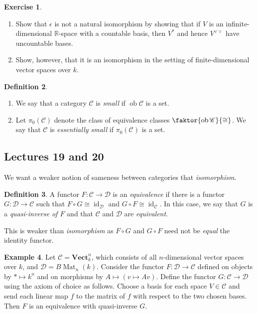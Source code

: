 \documentclass[10pt,letterpaper,cm]{nupset}
\theoremstyle{definition}
\newtheorem{definition}{Definition}[subsection]
\newtheorem{exmp}[definition]{Example}
\theoremstyle{theorem}
\newtheorem{exercise}[definition]{Exercise}
\theoremstyle{remark}
\newcommand{\R}{\mathbb R}
\newcommand{\1}{\mathbf{1}}
\renewcommand{\c}{\mathscr{C}}
\renewcommand{\d}{\mathscr{D}}
\newcommand{\0}{\vec 0}
\DeclareMathOperator{\id}{\mathrm{id}}
\DeclareMathOperator{\ob}{ob}
\DeclareMathOperator{\Mat}{Mat}
\begin{document}
\begin{exercise}  $ $
\begin{enumerate} 
\item Show that $\epsilon$ is not a natural isomorphism by showing that if $V$ is an infinite-dimensional $\R$-space with a countable basis, then $V^{\ast}$ and hence $V^{\vee \vee}$ have uncountable bases.
\item Show, however, that it is an isomorphism in the setting of finite-dimensional vector spaces over $k$.
\end{enumerate}
\end{exercise}

\begin{definition} $ $
\begin{enumerate}
\item We say that a category $\c$ is \textit{small} if $\ob{\c}$ is a set.
\item Let $\pi_0(\c)$ denote the class of equivalence classes $\faktor{\ob \c}{\cong}$. We say that $\c$ is \textit{essentially small} if $\pi_0(\c)$ is a set.
\end{enumerate}
\end{definition}

\subsection{Lectures 19 and 20}

We want a weaker notion of sameness between categories that \textit{isomorphism}.

\begin{definition}
A functor $F: \c \to \d$ is an \textit{equivalence} if there is a functor $G: \d \to \c$ such that $F \circ G \cong \id_{\d}$ and $G\circ F \cong \id_{\c}$. In this case, we say that $G$ is a \textit{quasi-inverse of $F$} and that $\c$ and $\d$ are \textit{equivalent}.
\end{definition}

This is weaker than \textit{isomorphism} as $F\circ G$ and $G\circ F$ need not be \textit{equal} the identity functor.

\smallskip

\begin{exmp}\label{vect}
Let $\c = \mathbf{Vect}_k^n$, which consists of all $n$-dimensional vector spaces over $k$, and $\d =  B{\Mat_n(k)}$. Consider the functor $F : \d \to \c$ defined on objects by $\ast \mapsto k^n$ and on morphisms by $A \mapsto \left(v \mapsto Av\right)$. Define the functor $G: \c \to \d$ using the axiom of choice as follows. Choose a basis for each space $V \in \c$ and send each linear map $f$ to the matrix of $f$ with respect to the two chosen bases. Then $F$ is an equivalence with quasi-inverse $G$.
\end{exmp}
\end{document}

